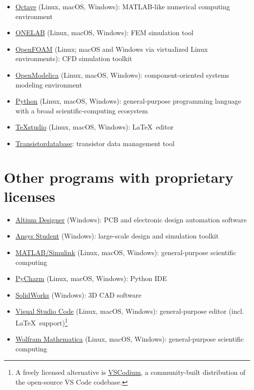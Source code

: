 \begin{itemize}
	\item \href{https://en.wikipedia.org/wiki/GNU_Octave}{Octave} (Linux, macOS, Windows): MATLAB-like numerical computing environment
	\item \href{https://onelab.info/}{ONELAB} (Linux, macOS, Windows): FEM simulation tool
	\item \href{https://openfoam.org/}{OpenFOAM} (Linux; macOS and Windows via virtualized Linux environments): CFD simulation toolkit
	\item \href{https://github.com/OpenModelica/OpenModelica}{OpenModelica} (Linux, macOS, Windows): component-oriented systems modeling environment
	\item \href{https://www.python.org/}{Python} (Linux, macOS, Windows): general-purpose programming language with a broad scientific-computing ecosystem
	\item \href{https://en.wikipedia.org/wiki/TeXstudio}{TeXstudio} (Linux, macOS, Windows): \LaTeX\ editor
	\item \href{https://github.com/upb-lea/transistordatabase}{Transistordatabase}: transistor data management tool
\end{itemize}

\section{Other programs with proprietary licenses}
\begin{itemize}
	\item \href{https://en.wikipedia.org/wiki/Altium_Designer}{Altium Designer} (Windows): PCB and electronic design automation software
	\item \href{https://www.ansys.com/de-de/academic/free-student-products}{Ansys Student} (Windows): large-scale design and simulation toolkit
	\item \href{https://en.wikipedia.org/wiki/MATLAB}{MATLAB/Simulink} (Linux, macOS, Windows): general-purpose scientific computing
	\item \href{https://en.wikipedia.org/wiki/PyCharm}{PyCharm} (Linux, macOS, Windows): Python IDE
	\item \href{https://en.wikipedia.org/wiki/SolidWorks}{SolidWorks} (Windows): 3D CAD software
	\item \href{https://en.wikipedia.org/wiki/Visual_Studio_Code}{Visual Studio Code} (Linux, macOS, Windows): general-purpose editor (incl. \LaTeX\ support)\footnote{A freely licensed alternative is \href{https://vscodium.com/}{VSCodium}, a community-built distribution of the open-source VS Code codebase.}
	\item \href{https://en.wikipedia.org/wiki/Wolfram_Mathematica}{Wolfram Mathematica} (Linux, macOS, Windows): general-purpose scientific computing
\end{itemize}
%
